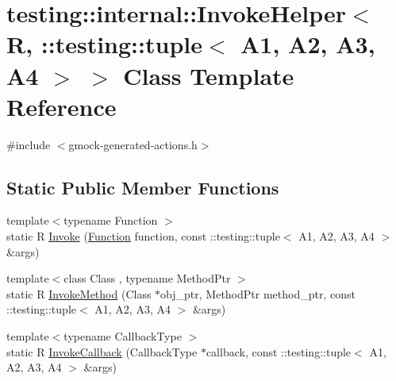 \hypertarget{classtesting_1_1internal_1_1_invoke_helper_3_01_r_00_01_1_1testing_1_1tuple_3_01_a1_00_01_a2_00_01_a3_00_01_a4_01_4_01_4}{}\section{testing\+::internal\+::Invoke\+Helper$<$ R, \+::testing\+::tuple$<$ A1, A2, A3, A4 $>$ $>$ Class Template Reference}
\label{classtesting_1_1internal_1_1_invoke_helper_3_01_r_00_01_1_1testing_1_1tuple_3_01_a1_00_01_a2_00_01_a3_00_01_a4_01_4_01_4}


{\ttfamily \#include $<$gmock-\/generated-\/actions.\+h$>$}

\subsection*{Static Public Member Functions}
\begin{DoxyCompactItemize}
\item 
{\footnotesize template$<$typename Function $>$ }\\static R \mbox{\hyperlink{classtesting_1_1internal_1_1_invoke_helper_3_01_r_00_01_1_1testing_1_1tuple_3_01_a1_00_01_a2_00_01_a3_00_01_a4_01_4_01_4_ae7107d300bd2ae7dc8109fb83675eecc}{Invoke}} (\mbox{\hyperlink{structtesting_1_1internal_1_1_function}{Function}} function, const \+::testing\+::tuple$<$ A1, A2, A3, A4 $>$ \&args)
\item 
{\footnotesize template$<$class Class , typename Method\+Ptr $>$ }\\static R \mbox{\hyperlink{classtesting_1_1internal_1_1_invoke_helper_3_01_r_00_01_1_1testing_1_1tuple_3_01_a1_00_01_a2_00_01_a3_00_01_a4_01_4_01_4_ad523e518f7f633bdd9f8a14b7d55708f}{Invoke\+Method}} (Class $\ast$obj\+\_\+ptr, Method\+Ptr method\+\_\+ptr, const \+::testing\+::tuple$<$ A1, A2, A3, A4 $>$ \&args)
\item 
{\footnotesize template$<$typename Callback\+Type $>$ }\\static R \mbox{\hyperlink{classtesting_1_1internal_1_1_invoke_helper_3_01_r_00_01_1_1testing_1_1tuple_3_01_a1_00_01_a2_00_01_a3_00_01_a4_01_4_01_4_a5750f17724281396353e4b6a8dd0e3d9}{Invoke\+Callback}} (Callback\+Type $\ast$callback, const \+::testing\+::tuple$<$ A1, A2, A3, A4 $>$ \&args)
\end{DoxyCompactItemize}


